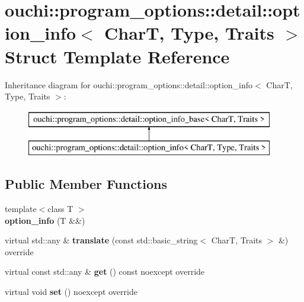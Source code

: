 \hypertarget{structouchi_1_1program__options_1_1detail_1_1option__info}{}\section{ouchi\+::program\+\_\+options\+::detail\+::option\+\_\+info$<$ CharT, Type, Traits $>$ Struct Template Reference}
\label{structouchi_1_1program__options_1_1detail_1_1option__info}
Inheritance diagram for ouchi\+::program\+\_\+options\+::detail\+::option\+\_\+info$<$ CharT, Type, Traits $>$\+:\begin{figure}[H]
\begin{center}
\leavevmode
\includegraphics[height=2.000000cm]{structouchi_1_1program__options_1_1detail_1_1option__info}
\end{center}
\end{figure}
\subsection*{Public Member Functions}
\begin{DoxyCompactItemize}
\item 
\mbox{\label{structouchi_1_1program__options_1_1detail_1_1option__info_a027892dd2d3ffb77b0ea3af9d161c580}} 
{\footnotesize template$<$class T $>$ }\\{\bfseries option\+\_\+info} (T \&\&)
\item 
\mbox{\label{structouchi_1_1program__options_1_1detail_1_1option__info_a9227e858c6f266ad20d25caa7bf4e744}} 
virtual std\+::any \& {\bfseries translate} (const std\+::basic\+\_\+string$<$ CharT, Traits $>$ \&) override
\item 
\mbox{\label{structouchi_1_1program__options_1_1detail_1_1option__info_aab93c54f4c926e0b8989d6f8eb9a3419}} 
virtual const std\+::any \& {\bfseries get} () const noexcept override
\item 
\mbox{\label{structouchi_1_1program__options_1_1detail_1_1option__info_a92bf71777bb138de1372ae4db4e929a1}} 
virtual void {\bfseries set} () noexcept override
\end{DoxyCompactItemize}
